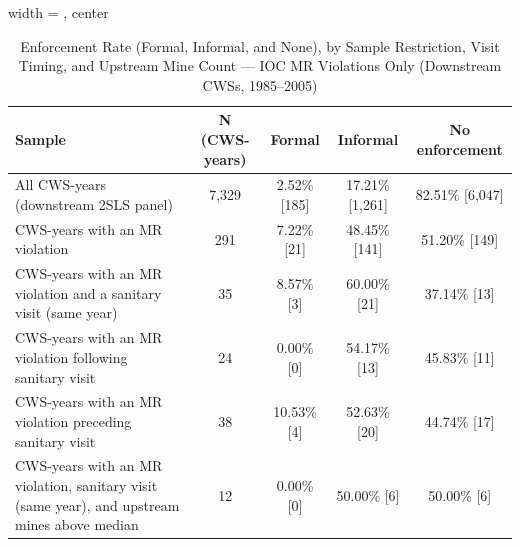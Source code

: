 \begin{table}[htbp]
\caption{\label{tab:sanitary_visit_timing_enforcement_rate_bychem_test} Enforcement Rate (Formal, Informal, and None), by Sample Restriction, Visit Timing, and Upstream Mine Count --- IOC MR Violations Only (Downstream CWSs, 1985--2005)}
\bigskip
\centering
\begin{adjustbox}{width = \textwidth, center}
\begin{tabular}{lcccc}
\toprule
Sample & N (CWS-years) & Formal & Informal & No enforcement \\
\midrule
All CWS-years (downstream 2SLS panel) & 7{,}329 & 2.52\% [185] & 17.21\% [1{,}261] & 82.51\% [6{,}047] \\
CWS-years with an MR violation & 291 & 7.22\% [21] & 48.45\% [141] & 51.20\% [149] \\
CWS-years with an MR violation and a sanitary visit (same year) & 35 & 8.57\% [3] & 60.00\% [21] & 37.14\% [13] \\
CWS-years with an MR violation following sanitary visit & 24 & 0.00\% [0] & 54.17\% [13] & 45.83\% [11] \\
CWS-years with an MR violation preceding sanitary visit & 38 & 10.53\% [4] & 52.63\% [20] & 44.74\% [17] \\
CWS-years with an MR violation, sanitary visit (same year), and upstream mines above median & 12 & 0.00\% [0] & 50.00\% [6] & 50.00\% [6] \\
\bottomrule
\end{tabular}
\end{adjustbox}
{\tiny\linespread{1}\selectfont \par \raggedright 
}
\end{table}
